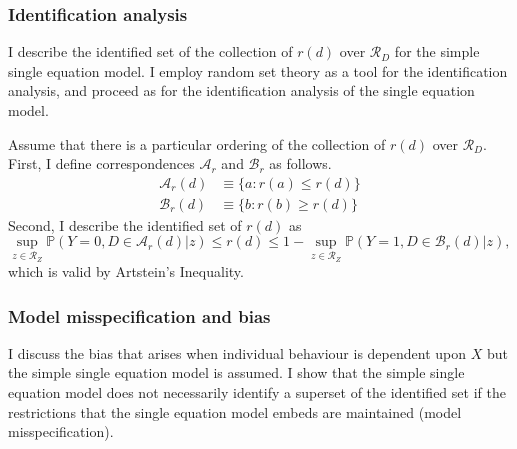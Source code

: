 \documentclass[12pt,a4paper,twoside]{article}
\numberwithin{equation}{section}
\newcommand{\Art}{Artstein's Inequality}
\begin{document}
\subsubsection{Identification analysis}
I describe the identified set of the collection of $r(d)$ over $\mathcal{R}_D$ for the simple single equation model. I employ random set theory as a tool for the identification analysis, and proceed as for the identification analysis of the single equation model. 

Assume that there is a particular ordering of the collection of $r(d)$ over $\mathcal{R}_D$. First, I define correspondences $\mathcal{A}_r$ and $\mathcal{B}_r$ as follows.
\begin{align*}
\mathcal{A}_r(d)&\equiv\lbrace a : r(a)\leq r(d)\rbrace\\
\mathcal{B}_r(d)&\equiv\lbrace b : r(b)\geq r(d)\rbrace
\end{align*}
Second, I describe the identified set of $r(d)$ as
\begin{equation}
\sup_{z\in\mathcal{R}_Z}\mathbb{P}(Y=0,D\in\mathcal{A}_r(d)|z)\leq r(d)\leq 1-\sup_{z\in\mathcal{R}_Z}\mathbb{P}(Y=1,D\in\mathcal{B}_r(d)|z),\label{eq:rident}
\end{equation}
which is valid by {\Art}.
\subsubsection{Model misspecification and bias}
I discuss the bias that arises when individual behaviour is dependent upon $X$ but the simple single equation model is assumed. I show that the simple single equation model does not necessarily identify a superset of the identified set if the restrictions that the single equation model embeds are maintained (model misspecification).
\end{document}
